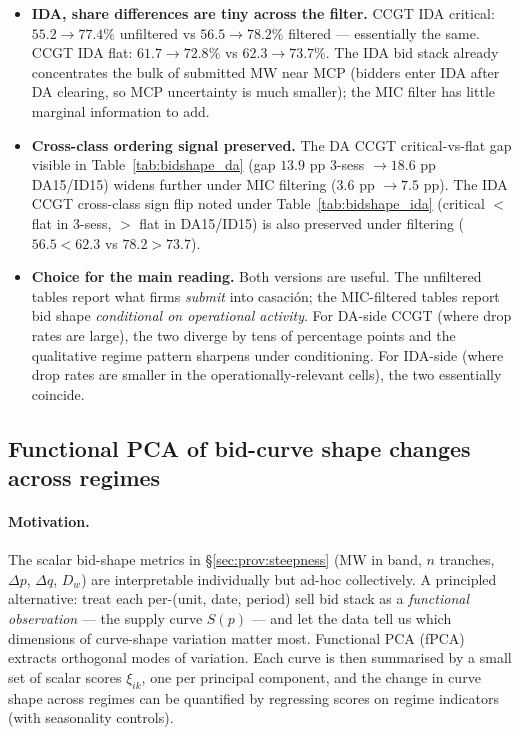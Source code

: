 \documentclass[11pt,a4paper]{article}
\begin{document}
\begin{itemize}
\item \textbf{IDA, share differences are tiny across the filter.} CCGT IDA critical: $55.2\to 77.4\%$ unfiltered vs $56.5\to 78.2\%$ filtered --- essentially the same. CCGT IDA flat: $61.7\to 72.8\%$ vs $62.3\to 73.7\%$. The IDA bid stack already concentrates the bulk of submitted MW near MCP (bidders enter IDA after DA clearing, so MCP uncertainty is much smaller); the MIC filter has little marginal information to add.
\item \textbf{Cross-class ordering signal preserved.} The DA CCGT critical-vs-flat gap visible in Table~\ref{tab:bidshape_da} (gap $13.9$ pp 3-sess $\to 18.6$ pp DA15/ID15) widens further under MIC filtering ($3.6$ pp $\to 7.5$ pp). The IDA CCGT cross-class sign flip noted under Table~\ref{tab:bidshape_ida} (critical $<$ flat in 3-sess, $>$ flat in DA15/ID15) is also preserved under filtering ($56.5 < 62.3$ vs $78.2 > 73.7$).
\item \textbf{Choice for the main reading.} Both versions are useful. The unfiltered tables report what firms \emph{submit} into casación; the MIC-filtered tables report bid shape \emph{conditional on operational activity}. For DA-side CCGT (where drop rates are large), the two diverge by tens of percentage points and the qualitative regime pattern sharpens under conditioning. For IDA-side (where drop rates are smaller in the operationally-relevant cells), the two essentially coincide.
\end{itemize}


\subsection{Functional PCA of bid-curve shape changes across regimes}\label{sec:prov:fpca}

\paragraph{Motivation.} The scalar bid-shape metrics in §\ref{sec:prov:steepness} (MW in band, $n$ tranches, $\Delta p$, $\Delta q$, $D_w$) are interpretable individually but ad-hoc collectively. A principled alternative: treat each per-(unit, date, period) sell bid stack as a \emph{functional observation} --- the supply curve $S(p)$ --- and let the data tell us which dimensions of curve-shape variation matter most. Functional PCA (fPCA) extracts orthogonal modes of variation. Each curve is then summarised by a small set of scalar scores $\xi_{ik}$, one per principal component, and the change in curve shape across regimes can be quantified by regressing scores on regime indicators (with seasonality controls).
\end{document}
